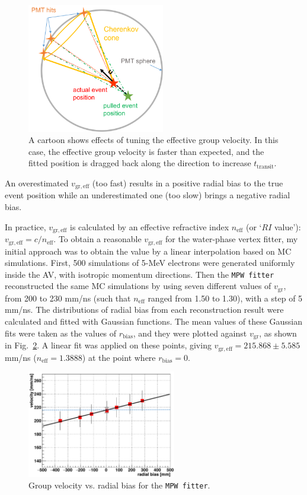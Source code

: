 \begin{figure}[!htb]
	\centering
	\includegraphics[width=6cm]{effectOfGroupVelocity.png}
	\caption[A cartoon shows effects of tuning the effective group velocity.]{A cartoon shows effects of tuning the effective group velocity. In this case, the effective group velocity is faster than expected, and the fitted position is dragged back along the direction to increase $t_\mathrm{transit}$.\label{fig:effectiveVg}}
\end{figure}
An overestimated $v_\mathrm{gr,eff}$ (too fast) results in a positive radial bias to the true event position while an underestimated one (too slow) brings a negative radial bias.

In practice, $v_\mathrm{gr,eff}$ is calculated by an effective refractive index $n_\mathrm{eff}$ (or `$RI$ value'): $v_\mathrm{gr,eff}=c/n_\mathrm{eff}$. To obtain a reasonable $v_\mathrm{gr,eff}$ for the water-phase vertex fitter, my initial approach was to obtain the value by a linear interpolation based on MC simulations. First, 500 simulations of 5-MeV electrons were generated uniformly inside the AV, with isotropic momentum directions. Then the \texttt{MPW fitter} reconstructed the same MC simulations by using seven different values of $v_\mathrm{gr}$, from 200 to 230 mm/ns (such that $n_\mathrm{eff}$ ranged from 1.50 to 1.30), with a step of 5 mm/ns. The distributions of radial bias from each reconstruction result were calculated and fitted with Gaussian functions. The mean values of these Gaussian fits were taken as the values of $r_\mathrm{bias}$, and they were plotted against $v_\mathrm{gr}$, as shown in Fig.~\ref{fig:plotVgr}. A linear fit was applied on these points, giving $v_\mathrm{gr,eff}=215.868\pm 5.585$ mm/ns ($n_\mathrm{eff}=1.3888$) at the point where $r_\mathrm{bias}=0$.

\begin{figure}[!htb]
	\centering
	\includegraphics[width=6.5cm]{tune_groupVelocity_MPW.png}
	\caption[Group velocity vs. radial bias for the \texttt{MPW fitter}.]{Group velocity vs. radial bias for the \texttt{MPW fitter}.	\label{fig:plotVgr}}
\end{figure}

